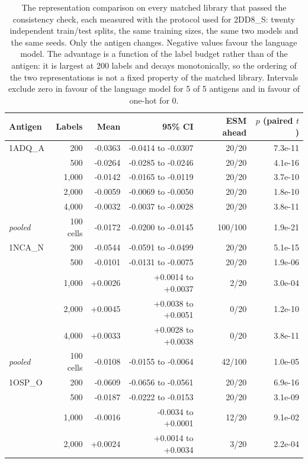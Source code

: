 \documentclass[11pt,a4paper]{article}
\begin{document}
\begin{table}[h]
\caption{The representation comparison on every matched library that passed the consistency check, each measured with the protocol used for 2DD8\_S: twenty independent train/test splits, the same training sizes, the same two models and the same seeds. Only the antigen changes. Negative values favour the language model. The advantage is a function of the label budget rather than of the antigen: it is largest at 200 labels and decays monotonically, so the ordering of the two representations is not a fixed property of the matched library. Intervals exclude zero in favour of the language model for 5 of 5 antigens and in favour of one-hot for 0.}
\centering
\begin{tabular}{@{}lrrrrr@{}}
\toprule
Antigen & Labels & Mean & 95\% CI & ESM ahead & $p$ (paired $t$) \\
\midrule
1ADQ\_A & 200 & -0.0363 & -0.0414 to -0.0307 & 20/20 & 7.3e-11 \\
 & 500 & -0.0264 & -0.0285 to -0.0246 & 20/20 & 4.1e-16 \\
 & 1,000 & -0.0142 & -0.0165 to -0.0119 & 20/20 & 3.7e-10 \\
 & 2,000 & -0.0059 & -0.0069 to -0.0050 & 20/20 & 1.8e-10 \\
 & 4,000 & -0.0032 & -0.0037 to -0.0028 & 20/20 & 3.8e-11 \\
\textit{pooled} & 100 cells & -0.0172 & -0.0200 to -0.0145 & 100/100 & 1.9e-21 \\
\midrule
1NCA\_N & 200 & -0.0544 & -0.0591 to -0.0499 & 20/20 & 5.1e-15 \\
 & 500 & -0.0101 & -0.0131 to -0.0075 & 20/20 & 1.9e-06 \\
 & 1,000 & +0.0026 & +0.0014 to +0.0037 & 2/20 & 3.0e-04 \\
 & 2,000 & +0.0045 & +0.0038 to +0.0051 & 0/20 & 1.2e-10 \\
 & 4,000 & +0.0033 & +0.0028 to +0.0038 & 0/20 & 3.8e-11 \\
\textit{pooled} & 100 cells & -0.0108 & -0.0155 to -0.0064 & 42/100 & 1.0e-05 \\
\midrule
1OSP\_O & 200 & -0.0609 & -0.0656 to -0.0561 & 20/20 & 6.9e-16 \\
 & 500 & -0.0187 & -0.0222 to -0.0153 & 20/20 & 3.1e-09 \\
 & 1,000 & -0.0016 & -0.0034 to +0.0001 & 12/20 & 9.1e-02 \\
 & 2,000 & +0.0024 & +0.0014 to +0.0034 & 3/20 & 2.2e-04 \\

\end{tabular}
\end{table}
\end{document}
